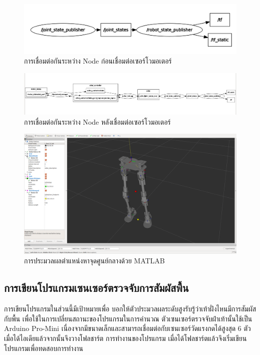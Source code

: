 \begin{figure}[!ht]
	\centering
	\includegraphics[width=\textwidth]{chapter4/images/com_uthai_node0.png}
	\caption{การเชื่อมต่อกันระหว่าง Node ก่อนเชื่อมต่อเซอร์โวมอเตอร์}
\end{figure}
\begin{figure}[!ht]
	\centering
	\includegraphics[width=\textwidth]{chapter4/images/com_uthai_node.png}
	\caption{การเชื่อมต่อกันระหว่าง Node หลังเชื่อมต่อเซอร์โวมอเตอร์}
\end{figure}
\begin{figure}[!ht]
	\centering
	\includegraphics[width=\textwidth]{chapter4/images/com_uthai.png}
	\caption{การประมวลผลตำแหน่งหาจุดศูนย์กลางด้วย MATLAB}
\end{figure}

\clearpage
\subsection{การเขียนโปรแกรมเซนเซอร์ตรวจจับการสัมผัสพื้น}
การเขียนโปรแกรมในส่วนนี้มีเป้าหมายเพื่อ บอกให้ตัวประมวลผลระดับสูงรับรู้ว่าเท้าฝั่งไหนมีการสัมผัสกับพื้น
เพื่อใช้ในการเปลี่ยนสถานะของโปรแกรมในการคำนวณ ตัวเซนเซอร์ตรวจจับฝ่าเท้านั้นใช้เป็น Arduino Pro-Mini
เนื่องจากมีขนาดเล็กและสามารถเชื่อมต่อกับเซนเซอร์วัดแรงกดได้สูงสุด 6 ตัว เมื่อได้ไอเดียแล้วจากนั้นจึงวางโฟลชาร์ต
การทำงานของโปรแกรม เมื่อได้โฟลชาร์ตแล้วจึงเริ่มเขียนโปรแกรมเพื่อทดสอบการทำงาน

